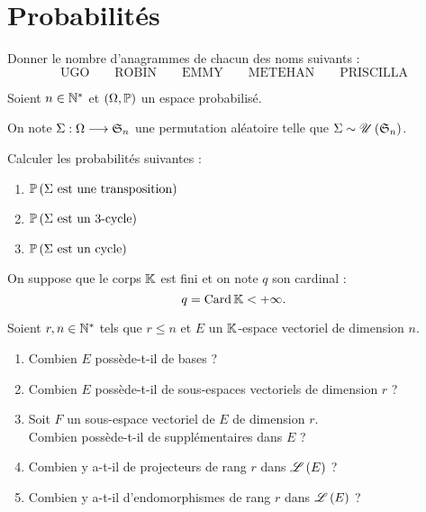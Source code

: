 \chapter{Probabilités}

\minitoc

\begin{exo}[Exercice 1]
Donner le nombre d'anagrammes de chacun des noms suivants : \[\text{UGO}\qquad\text{ROBIN}\qquad\text{EMMY}\qquad\text{METEHAN}\qquad\text{PRISCILLA}\]
\end{exo}

\begin{corr}
\end{corr}

\begin{exo}[Exercice 2]
Soient \(n\in\Ns\) et \(\groupe{\Omega}[\prem]\) un espace probabilisé.

On note \(\Sigma:\Omega\to\S{n}\) une permutation aléatoire telle que \(\Sigma\sim\loiuniforme{\S{n}}\).

Calculer les probabilités suivantes :

\begin{enumerate}
    \item \(\proba{\Sigma\text{ est une transposition}}\) \\
    \item \(\proba{\Sigma\text{ est un 3-cycle}}\) \\
    \item \(\proba{\Sigma\text{ est un cycle}}\)
\end{enumerate}
\end{exo}

\begin{corr}
\end{corr}

\begin{exo}
On suppose que le corps \(\K\) est fini et on note \(q\) son cardinal : \[q=\Card\K<\pinf.\]

Soient \(r,n\in\Ns\) tels que \(r\leq n\) et \(E\) un \(\K\)-espace vectoriel de dimension \(n\).

\begin{enumerate}
    \item Combien \(E\) possède-t-il de bases ? \\
    \item Combien \(E\) possède-t-il de sous-espaces vectoriels de dimension \(r\) ? \\
    \item Soit \(F\) un sous-espace vectoriel de \(E\) de dimension \(r\). \\ Combien possède-t-il de supplémentaires dans \(E\) ? \\
    \item Combien y a-t-il de projecteurs de rang \(r\) dans \(\Lendo{E}\) ? \\
    \item Combien y a-t-il d'endomorphismes de rang \(r\) dans \(\Lendo{E}\) ?
\end{enumerate}
\end{exo}


